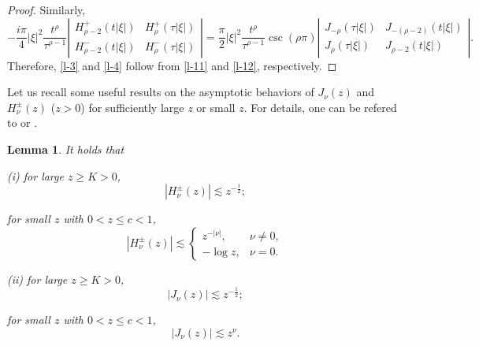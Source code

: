 \documentclass[11pt,twoside]{article}
\newcommand{\f}{\frac}
\theoremstyle{plain}
\newtheorem{lemma}[theorem]{Lemma}
\theoremstyle{definition}
\theoremstyle{remark}
\numberwithin{equation}{section}
\begin{document}
\begin{proof}
Similarly,
\begin{equation}\label{l-12}
-\frac{i \pi}{4}|\xi|^2 \frac{t^{\rho}}{\tau^{\rho-1}}\left|\begin{array}{ll}
H_{\rho-2}^{+}(t|\xi|) & H_{\rho}^{+}(\tau|\xi|) \\
H_{\rho-2}^{-}(t|\xi|) & H_{\rho}^{-}(\tau|\xi|)
\end{array}\right|=\frac{ \pi}{2}|\xi|^2 \frac{t^{\rho}}{\tau^{\rho-1}}\csc(\rho\pi)\left|\begin{array}{ll}
J_{-\rho}(\tau|\xi|) & J_{-(\rho-2)}(t|\xi|) \\
J_{\rho}(\tau|\xi|) & J_{\rho-2}(t|\xi|)
\end{array}\right|.
\end{equation}
Therefore, \eqref{l-3} and \eqref{l-4} follow from \eqref{l-11} and \eqref{l-12}, respectively.
\end{proof}


Let us  recall some useful results on the asymptotic behaviors of $J_{\nu}(z)$ and $H_{\nu}^{\pm}(z)$ ($z>0$)
for sufficiently large $z$ or small $z$. For details,
one can be refered to \cite[Section 10]{OLBC} or \cite[\S3.13, \S3.52, \S10.6 and \S7.2]{Wat}.



\begin{lemma}\label{lem1}
It holds that

(i) for large $z\geq K > 0$,
\begin{equation}\label{equ:q12}
|H_{\nu}^{\pm}(z)|\lesssim z^{-\f{1}{2}};
\end{equation}

for small $z$ with $0<z\leq c<1$,
\begin{equation}\label{equ:q13}
\left|H_{\nu}^{ \pm}(z)\right| \lesssim \begin{cases}z^{-|\nu|}, & \nu \neq 0, \\
-\log z, & \nu=0.
\end{cases}
\end{equation}

(ii) for large $z\geq K > 0$,
\begin{equation}\label{equ:q14}
|J_{\nu}(z)|\lesssim z^{-\f{1}{2}};
\end{equation}

for small $z$ with $0<z\leq c<1$,
\begin{equation}\label{equ:q15}
|J_{\nu}(z)|\lesssim z^{\nu}.
\end{equation}
\end{lemma}
\end{document}
